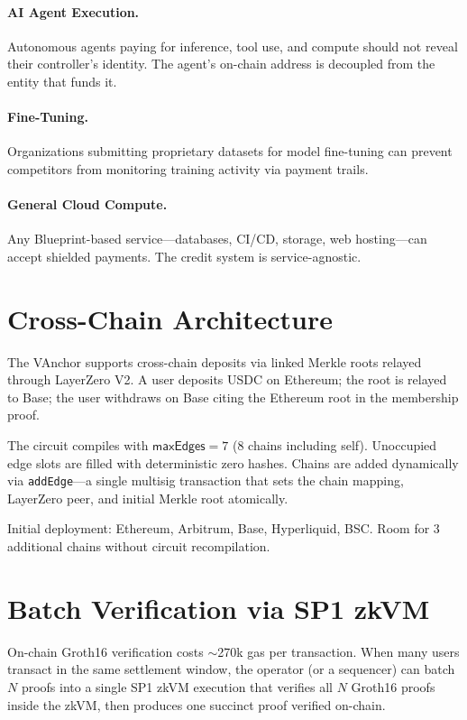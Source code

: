 \documentclass[11pt,a4paper]{article}
\theoremstyle{definition}
\begin{document}
\paragraph{AI Agent Execution.}
Autonomous agents paying for inference, tool use, and compute should not reveal their controller's identity. The agent's on-chain address is decoupled from the entity that funds it.

\paragraph{Fine-Tuning.}
Organizations submitting proprietary datasets for model fine-tuning can prevent competitors from monitoring training activity via payment trails.

\paragraph{General Cloud Compute.}
Any Blueprint-based service---databases, CI/CD, storage, web hosting---can accept shielded payments. The credit system is service-agnostic.

\section{Cross-Chain Architecture}

The VAnchor supports cross-chain deposits via linked Merkle roots relayed through LayerZero V2. A user deposits USDC on Ethereum; the root is relayed to Base; the user withdraws on Base citing the Ethereum root in the membership proof.

The circuit compiles with $\mathsf{maxEdges} = 7$ (8 chains including self). Unoccupied edge slots are filled with deterministic zero hashes. Chains are added dynamically via \texttt{addEdge}---a single multisig transaction that sets the chain mapping, LayerZero peer, and initial Merkle root atomically.

Initial deployment: Ethereum, Arbitrum, Base, Hyperliquid, BSC. Room for 3 additional chains without circuit recompilation.

\section{Batch Verification via SP1 zkVM}

On-chain Groth16 verification costs $\sim$270k gas per transaction. When many users transact in the same settlement window, the operator (or a sequencer) can batch $N$ proofs into a single SP1 zkVM execution that verifies all $N$ Groth16 proofs inside the zkVM, then produces one succinct proof verified on-chain.
\end{document}
